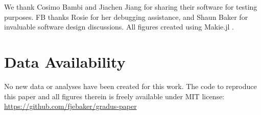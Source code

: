 \documentclass[fleqn,usenatbib]{mnras}
\begin{document}
We thank Cosimo Bambi and Jiachen Jiang for sharing their software for testing purposes. FB thanks Rosie for her debugging assistance, and Shaun Baker for invaluable software design discussions. All figures created using Makie.jl \citep{DanischKrumbiegel2021}.

\section*{Data Availability}

No new data or analyses have been created for this work. The code to reproduce this paper and all figures therein is freely available under MIT license:
\url{https://github.com/fjebaker/gradus-paper}










\appendix








\bsp	%
\label{lastpage}
\end{document}
